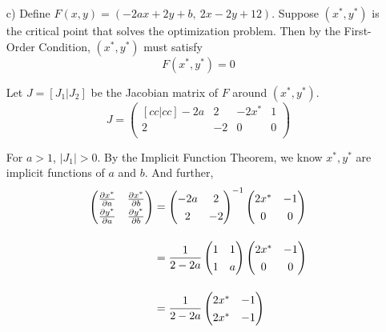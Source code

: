 \documentclass{article}
\begin{document}
\begin{enumerate}
\begin{enumerate}
            \item[c)] Define $F(x,y) = ( -2ax + 2y + b,\ 2x - 2y + 12 )$. 
            Suppose $(x^*, y^*)$ is the critical point that solves the optimization problem. 
            Then by the First-Order Condition, $(x^*, y^*)$ must satisfy $$F(x^*, y^*) = 0$$
            
            Let $J=[J_1|J_2]$ be the Jacobian matrix of $F$ around $(x^*, y^*)$. 
            \[
                J = \begin{pmatrix}[cc|cc]
                    -2a & 2 & -2x^* & 1 \\
                    2 & -2 & 0 & 0 \\
                \end{pmatrix}
            \]
            
            For $a > 1$, $|J_1| > 0$. By the Implicit Function Theorem, we know $x^*, y^*$ are 
            implicit functions of $a$ and $b$. And further, 
            \begin{align*}
                \def\arraystretch{1.3}
                \begin{pmatrix}
                    \frac{\partial x^*}{\partial a} & \frac{\partial x^*}{\partial b} \\
                    \frac{\partial y^*}{\partial a} & \frac{\partial y^*}{\partial b} \\
                \end{pmatrix} &= 
                \begin{pmatrix}
                    -2a & 2 \\
                    2 & -2  \\
                \end{pmatrix}^{-1}
                 \begin{pmatrix}
                    2x^* & -1 \\
                    0 & 0 \\
                \end{pmatrix}\\[1em] 
                &= \frac{1}{2-2a}
                \begin{pmatrix}
                    1 & 1 \\
                    1 & a \\
                \end{pmatrix}
                \begin{pmatrix}
                    2x^* & -1 \\
                    0 & 0 \\
                \end{pmatrix}\\[1em]
                &= \frac{1}{2-2a}
                \begin{pmatrix}
                    2x^* & -1 \\
                    2x^* & -1 \\
                \end{pmatrix}
            \end{align*}
        

\end{enumerate}
\end{enumerate}
\end{document}
